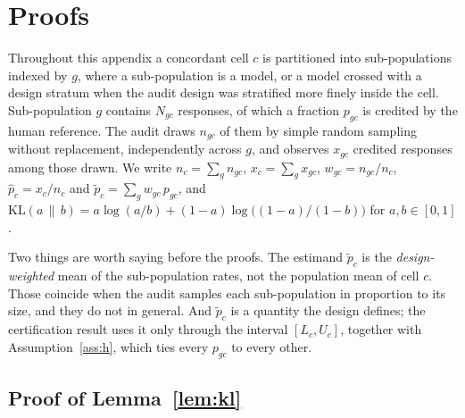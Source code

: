 
\appendix

\section{Proofs}
\label{app:proofs}

Throughout this appendix a concordant cell $c$ is partitioned into sub-populations indexed by
$g$, where a sub-population is a model, or a model crossed with a design stratum when the
audit design was stratified more finely inside the cell. Sub-population $g$ contains $N_{gc}$
responses, of which a fraction $p_{gc}$ is credited by the human reference. The audit draws
$n_{gc}$ of them by simple random sampling without replacement, independently across $g$, and
observes $x_{gc}$ credited responses among those drawn. We write
$n_c = \sum_g n_{gc}$, $x_c = \sum_g x_{gc}$, $w_{gc} = n_{gc}/n_c$,
$\hat p_c = x_c / n_c$ and $\tilde p_c = \sum_g w_{gc}\, p_{gc}$, and
$\mathrm{KL}(a \,\|\, b) = a \log(a/b) + (1-a)\log\bigl((1-a)/(1-b)\bigr)$ for
$a, b \in [0,1]$.

Two things are worth saying before the proofs. The estimand $\tilde p_c$ is the
\emph{design-weighted} mean of the sub-population rates, not the population mean of cell $c$.
Those coincide when the audit samples each sub-population in proportion to its size, and they
do not in general. And $\tilde p_c$ is a quantity the design defines; the certification result
uses it only through the interval $[L_c, U_c]$, together with
Assumption~\ref{ass:h}, which ties every $p_{gc}$ to every other.

\subsection{Proof of Lemma~\ref{lem:kl}}

